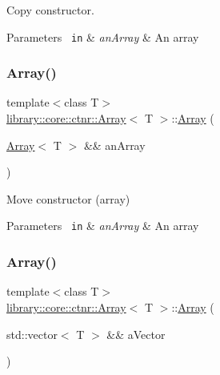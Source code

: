 Copy constructor. 


\begin{DoxyParams}[1]{Parameters}
\mbox{\texttt{ in}}  & {\em an\+Array} & An array \\
\hline
\end{DoxyParams}
\mbox{\label{classlibrary_1_1core_1_1ctnr_1_1_array_ac8f7c5d2c05b3acb427fdeb15656f110}} 
\subsubsection{\texorpdfstring{Array()}{Array()}\hspace{0.1cm}{\footnotesize\ttfamily [7/8]}}
{\footnotesize\ttfamily template$<$class T$>$ \\
\mbox{\hyperlink{classlibrary_1_1core_1_1ctnr_1_1_array}{library\+::core\+::ctnr\+::\+Array}}$<$ T $>$\+::\mbox{\hyperlink{classlibrary_1_1core_1_1ctnr_1_1_array}{Array}} (\begin{DoxyParamCaption}\item[{\mbox{\hyperlink{classlibrary_1_1core_1_1ctnr_1_1_array}{Array}}$<$ T $>$ \&\&}]{an\+Array }\end{DoxyParamCaption})\hspace{0.3cm}{\ttfamily [default]}}



Move constructor (array) 


\begin{DoxyParams}[1]{Parameters}
\mbox{\texttt{ in}}  & {\em an\+Array} & An array \\
\hline
\end{DoxyParams}
\mbox{\label{classlibrary_1_1core_1_1ctnr_1_1_array_a8a0e7141a92b203ca411778799db9696}} 
\subsubsection{\texorpdfstring{Array()}{Array()}\hspace{0.1cm}{\footnotesize\ttfamily [8/8]}}
{\footnotesize\ttfamily template$<$class T$>$ \\
\mbox{\hyperlink{classlibrary_1_1core_1_1ctnr_1_1_array}{library\+::core\+::ctnr\+::\+Array}}$<$ T $>$\+::\mbox{\hyperlink{classlibrary_1_1core_1_1ctnr_1_1_array}{Array}} (\begin{DoxyParamCaption}\item[{std\+::vector$<$ T $>$ \&\&}]{a\+Vector }\end{DoxyParamCaption})}



